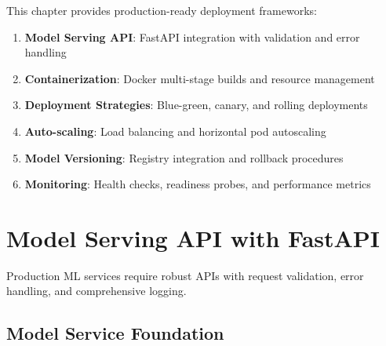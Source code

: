 This chapter provides production-ready deployment frameworks:

\begin{enumerate}
    \item \textbf{Model Serving API}: FastAPI integration with validation and error handling
    \item \textbf{Containerization}: Docker multi-stage builds and resource management
    \item \textbf{Deployment Strategies}: Blue-green, canary, and rolling deployments
    \item \textbf{Auto-scaling}: Load balancing and horizontal pod autoscaling
    \item \textbf{Model Versioning}: Registry integration and rollback procedures
    \item \textbf{Monitoring}: Health checks, readiness probes, and performance metrics
\end{enumerate}

\section{Model Serving API with FastAPI}

Production ML services require robust APIs with request validation, error handling, and comprehensive logging.

\subsection{Model Service Foundation}

